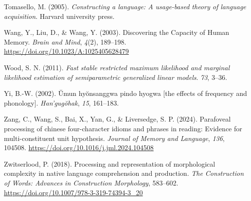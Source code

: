 \documentclass[
  man,floatsintext]{apa6}
\newlength{\cslhangindent}
\newlength{\cslentryspacingunit} %
\newenvironment{CSLReferences}[2] %
 {%
  \setlength{\parindent}{0pt}
  \ifodd #1
  \let\oldpar\par
  \def\par{\hangindent=\cslhangindent\oldpar}
  \fi
  \setlength{\parskip}{#2\cslentryspacingunit}
 }%
 {}
\begin{document}
\begin{CSLReferences}{1}{0}
\leavevmode{}%
Tomasello, M. (2005). \emph{Constructing a language: A usage-based theory of language acquisition}. Harvard university press.

\leavevmode{}%
Wang, Y., Liu, D., \& Wang, Y. (2003). Discovering the Capacity of Human Memory. \emph{Brain and Mind}, \emph{4}(2), 189--198. \url{https://doi.org/10.1023/A:1025405628479}

\leavevmode{}%
Wood, S. N. (2011). \emph{Fast stable restricted maximum likelihood and marginal likelihood estimation of semiparametric generalized linear models}. \emph{73}, 3--36.

\leavevmode{}%
Yi, B.-W. (2002). Ŭmun hyŏnsanggwa pindo hyogwa {[}the effects of frequency and phonology{]}. \emph{Han'gugŏhak}, \emph{15}, 161--183.

\leavevmode{}%
Zang, C., Wang, S., Bai, X., Yan, G., \& Liversedge, S. P. (2024). Parafoveal processing of chinese four-character idioms and phrases in reading: Evidence for multi-constituent unit hypothesis. \emph{Journal of Memory and Language}, \emph{136}, 104508. \url{https://doi.org/10.1016/j.jml.2024.104508}

\leavevmode{}%
Zwitserlood, P. (2018). Processing and representation of morphological complexity in native language comprehension and production. \emph{The Construction of Words: Advances in Construction Morphology}, 583--602. \url{https://doi.org/10.1007/978-3-319-74394-3_20}

\end{CSLReferences}
\end{document}
